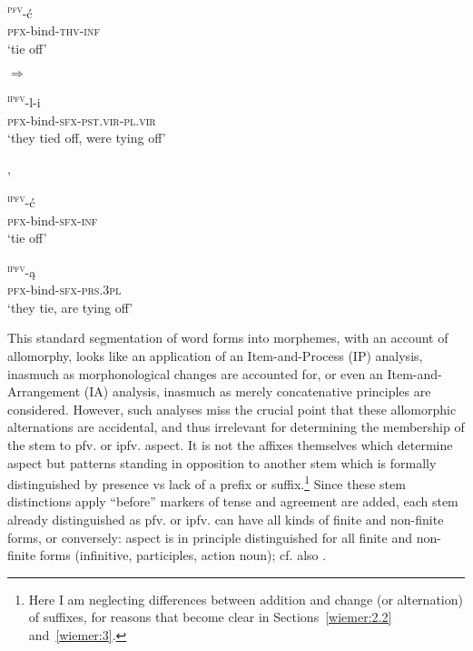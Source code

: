 \documentclass[output=paper]{langscibook}
\begin{document}
\begin{minipage}[t]{.4\textwidth}
\textsc{\textsuperscript{pfv}}{{}-ć}\\
     \textsc{pfx}{}-bind-\textsc{thv-inf}\\
\glt  ‘tie off’ \\
\end{minipage}
 \ex \label{ex:wiemer:4b}
  ${\Rightarrow}$ \begin{minipage}[t]{.366\textwidth}
  \textsc{\textsuperscript{ipfv}}{{}-l-i}\\   
   \textsc{pfx}{}-bind-\textsc{sfx-pst.vir-pl.vir}\\
   \glt     ‘they tied off, were tying off’
   \end{minipage} , \hspace{1ex} \begin{minipage}[t]{.35\textwidth}
 \textsc{\textsuperscript{ipfv}}{{}-ć}\\
       \textsc{pfx}{}-bind-\textsc{sfx-inf}\\
 \glt ‘tie off’\\
 \end{minipage}
 \ex \label{ex:wiemer:4c}
 \textsc{\textsuperscript{ipfv}}{{}-ą}\\
    \textsc{pfx}{}-bind-\textsc{sfx-prs.3pl}\\
  \glt   ‘they tie, are tying off’\\
 \z\z


This standard segmentation of word forms into morphemes, with an account of allomorphy, looks like an application of an Item-and-Process (IP) analysis, inasmuch as morphonological changes are accounted for, or even an Item-and-Arrangement (IA) analysis, inasmuch as merely  concatenative principles are considered. However, such analyses miss the crucial point that these allomorphic alternations are accidental, and thus irrelevant for determining the membership of the stem to pfv. or ipfv. aspect. It is not the affixes themselves which determine aspect but patterns standing in opposition to another stem which is formally distinguished by presence vs lack of a prefix or suffix.\footnote{Here I am neglecting differences between addition and change (or alternation) of suffixes, for reasons that become clear in Sections~\ref{wiemer:2.2} and~\ref{wiemer:3}.} Since these stem distinctions apply “before” markers of tense and agreement are added, each stem already distinguished as pfv. or ipfv. can have all kinds of finite and non-finite forms, or conversely: aspect is in principle distinguished for all finite and non-finite forms (infinitive, participles, action noun); cf. also .
\end{document}
